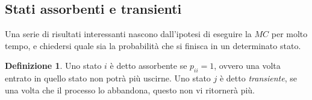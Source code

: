 \documentclass{article}
\theoremstyle{definition}
\theoremstyle{definition}
\newtheorem{definition}[theorem]{Definizione}
\theoremstyle{remark}
\begin{document}
\subsection{Stati assorbenti e transienti}
Una serie di risultati interessanti nascono dall'ipotesi di eseguire la $MC$ per molto tempo, e chiedersi quale sia la probabilità che
si finisca in un determinato stato.
\begin{definition}
    Uno stato $i$ è detto assorbente se $p_{ii} = 1$, ovvero una volta entrato in quello stato non potrà più uscirne. Uno stato $j$ è detto \textit{transiente},
    se una volta che il processo lo abbandona, questo non vi ritornerà più.
\end{definition}

\begin{center}



    \begin{tikzpicture}[x=0.75pt,y=0.75pt,yscale=-1,xscale=1]


\end{tikzpicture}
\end{center}
\end{document}
